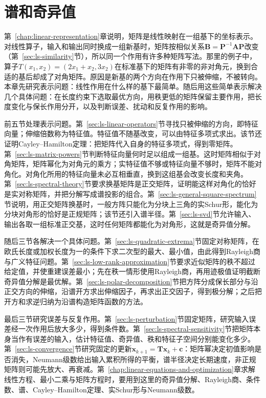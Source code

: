 \chapter{谱和奇异值}
\label{chap:linear-analysis}
\label{chap:matrix-analysis}

第~\ref{chap:linear-representation}章说明，矩阵是线性映射在一组基下的坐标表示。对线性算子，输入和输出同时换成一组新基时，矩阵按相似关系$\bm B=\bm P^{-1}\bm A\bm P$改变（第~\ref{sec:ls-similarity}节），所以同一个作用有许多种矩阵写法。那里的例子中，算子$T(x_1,x_2)=(2x_1+x_2,3x_2)$在标准基下的矩阵有非零的非对角元，换到合适的基后却成了对角矩阵。原因是新基的两个方向在作用下只被伸缩，不被转向。本章先研究表示问题：线性作用在什么样的基下最简单。随后用这些简单表示解决几个具体问题：在长度约束下选取最优方向，用秩更低的矩阵保留主要作用，把长度变化与保长作用分开，以及判断误差、扰动和反复作用的影响。

前五节处理表示问题。第~\ref{sec:ls-linear-operators}节寻找只被伸缩的方向，即特征向量；伸缩倍数称为特征值。特征值不随基改变，可以由特征多项式求出。该节还证明Cayley--Hamilton定理：把矩阵代入自身的特征多项式，得到零矩阵。第~\ref{sec:ls-matrix-powers}节判断特征向量何时足以组成一组基。这时矩阵相似于对角矩阵，矩阵幂化为对角元的乘方；实特征值不够或特征向量不够时，矩阵不能对角化。对角化所用的特征向量未必互相垂直，换到这组基会改变长度和夹角。第~\ref{sec:ls-spectral-theory}节要求换基矩阵是正交矩阵，证明能这样对角化的恰好是实对称矩阵，并把分解写成谱投影的组合。第~\ref{sec:ls-general-square-spectrum}节说明，用正交矩阵换基时，一般方阵只能化为分块上三角的实Schur形，能化为分块对角形的恰好是正规矩阵；该节还引入谱半径。第~\ref{sec:ls-svd}节允许输入、输出各取一组标准正交基，这时任何矩阵都能化为对角形，这就是奇异值分解。

随后三节各解决一个具体问题。第~\ref{sec:ls-quadratic-extrema}节固定对称矩阵，在欧氏长度或加权长度为一的条件下求二次型的最大、最小值，由此得到Rayleigh商与广义特征问题。第~\ref{sec:ls-low-rank-approximation}节要求近似矩阵的秩不超过给定值，并使重建误差最小；先在秩一情形使用Rayleigh商，再用迹极值证明截断奇异值分解是最优解。第~\ref{sec:ls-polar-decomposition}节把方阵分成保长部分与沿正交方向的伸缩，沿谱开方求出伸缩因子，再求出正交因子，得到极分解；之后把开方和求逆归纳为沿谱构造矩阵函数的方法。

最后三节研究误差与反复作用。第~\ref{sec:ls-perturbation}节固定矩阵，研究输入误差经一次作用后放大多少，得到条件数。第~\ref{sec:ls-spectral-sensitivity}节把矩阵本身当作有误差的输入，估计特征值、奇异值、秩和特征子空间分别能变化多少。第~\ref{sec:ls-convergence}节研究固定的更新$\bm x_{k+1}=\bm T\bm x_k+\bm c$：矩阵幂决定初值影响是否消失，Neumann级数给出输入累积所得的平衡，谱半径决定长期速度，非正规矩阵则可能先放大、再衰减。第~\ref{chap:linear-equations-and-optimization}章求解线性方程、最小二乘与矩阵方程时，要用到这里的奇异值分解、Rayleigh商、条件数、谱、Cayley--Hamilton定理、实Schur形与Neumann级数。

